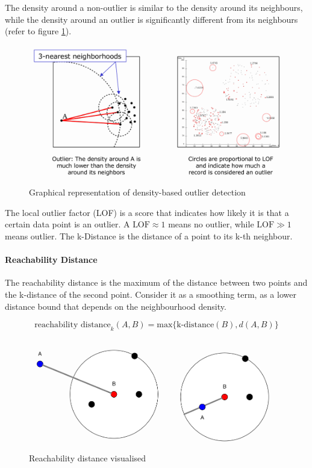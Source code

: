 \documentclass[11pt]{article}
\begin{document}
The density around a non-outlier is similar to the density around its neighbours, while the density around an outlier is significantly different from its neighbours (refer to figure \ref{fig:outlierdensity-based}).

\begin{figure}[tbh!]
    \centering
    \includegraphics[width=0.6\linewidth, keepaspectratio]{Pictures/outlier_density-based}
    \caption{Graphical representation of density-based outlier detection}
    \label{fig:outlierdensity-based}
\end{figure}

The local outlier factor (LOF) is a score that indicates how likely it is that a certain data point is an outlier. A $\text{LOF} \approx 1$ means no outlier, while $\text{LOF} \gg 1$ means outlier. The k-Distance is the distance of a point to its k-th neighbour.

\paragraph{Reachability Distance}

The reachability distance is the maximum of the distance between two points and the k-distance of the second point. Consider it as a smoothing term, as a lower distance bound that depends on the neighbourhood density.

\begin{equation}
    \text{reachability distance}_k (A,B) = \text{max}\{\text{k-distance}(B), d(A,B) \}
\end{equation}

\begin{figure}[tbh!]
    \centering
    \includegraphics[width=0.5\linewidth, keepaspectratio]{Pictures/outlier_reachability_distance}
    \caption{Reachability distance visualised}
    \label{fig:outlierreachabilitydistance}
\end{figure}
\end{document}
